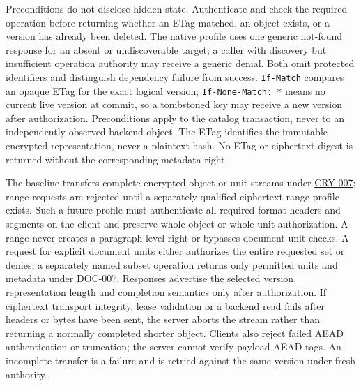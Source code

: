 \documentclass[11pt,a4paper]{article}
\newcommand{\code}[1]{{\small\nolinkurl{#1}}}
\newcommand{\rr}[1]{\hyperlink{req:#1}{#1}}
\begin{document}
Preconditions do not disclose hidden state. Authenticate and check the required operation before returning whether an ETag matched, an object exists, or a version has already been deleted. The native profile uses one generic not-found response for an absent or undiscoverable target; a caller with discovery but insufficient operation authority may receive a generic denial. Both omit protected identifiers and distinguish dependency failure from success. \code{If-Match} compares an opaque ETag for the exact logical version; \code{If-None-Match: *} means no current live version at commit, so a tombstoned key may receive a new version after authorization. Preconditions apply to the catalog transaction, never to an independently observed backend object. The ETag identifies the immutable encrypted representation, never a plaintext hash. No ETag or ciphertext digest is returned without the corresponding metadata right.

The baseline transfers complete encrypted object or unit streams under \rr{CRY-007}; range requests are rejected until a separately qualified ciphertext-range profile exists. Such a future profile must authenticate all required format headers and segments on the client and preserve whole-object or whole-unit authorization. A range never creates a paragraph-level right or bypasses document-unit checks. A request for explicit document units either authorizes the entire requested set or denies; a separately named subset operation returns only permitted units and metadata under \rr{DOC-007}. Responses advertise the selected version, representation length and completion semantics only after authorization. If ciphertext transport integrity, lease validation or a backend read fails after headers or bytes have been sent, the server aborts the stream rather than returning a normally completed shorter object. Clients also reject failed AEAD authentication or truncation; the server cannot verify payload AEAD tags. An incomplete transfer is a failure and is retried against the same version under fresh authority.
\end{document}
